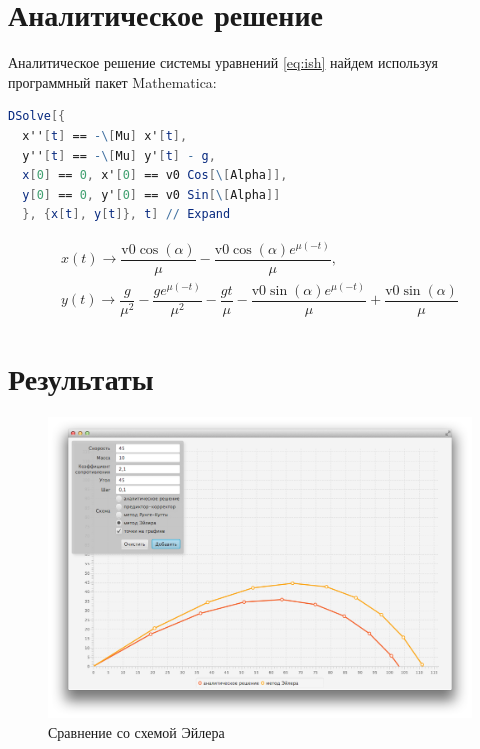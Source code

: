 \documentclass[a4paper, titlepage]{article}
\begin{document}
\section{Аналитическое решение}
Аналитическое решение системы уравнений \ref{eq:ish} найдем используя программный пакет Mathematica:
\begin{lstlisting}[language=mathematica]
DSolve[{
  x''[t] == -\[Mu] x'[t],
  y''[t] == -\[Mu] y'[t] - g,
  x[0] == 0, x'[0] == v0 Cos[\[Alpha]],
  y[0] == 0, y'[0] == v0 Sin[\[Alpha]]
  }, {x[t], y[t]}, t] // Expand
\end{lstlisting}

\begin{equation*}
\begin{array}{l}
x(t)\to \dfrac{\text{v0} \cos (\alpha )}{\mu }-\dfrac{\text{v0} \cos (\alpha ) e^{\mu  (-t)}}{\mu }, \\[0.7em]
y(t)\to \dfrac{g}{\mu ^2}-\dfrac{g e^{\mu  (-t)}}{\mu ^2}-\dfrac{g t}{\mu }-\dfrac{\text{v0} \sin (\alpha ) e^{\mu  (-t)}}{\mu }+\dfrac{\text{v0} \sin (\alpha )}{\mu }
\end{array}
\end{equation*}

\section{Результаты}

\begin{figure}[H]
\caption{Сравнение со схемой Эйлера}
\includegraphics[width=\textwidth]{euler}
\end{figure}
\end{document}
